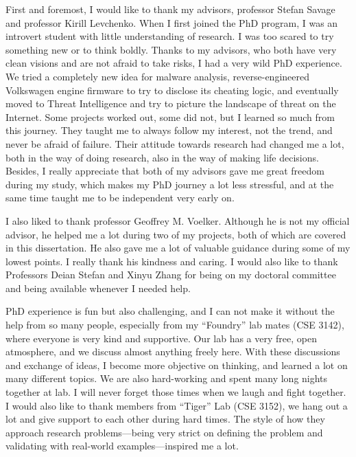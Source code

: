 \begin{acknowledgements}
First and foremost, I would like to thank my advisors, professor Stefan
Savage and professor Kirill Levchenko. When I first joined the PhD program,
I was an introvert student with little understanding of research. I was
too scared to try something new or to think boldly. Thanks to my advisors,
who both have very clean visions and are not afraid to take risks, I had a 
very wild PhD experience. We tried a completely new idea for malware 
analysis, reverse-engineered Volkswagen engine firmware to try to disclose 
its cheating logic, and eventually moved to Threat Intelligence and try to 
picture the landscape of threat on the Internet. Some projects worked out, 
some did not, but I learned so much from this journey. They taught me
to always follow my interest, not the trend, and never be afraid of 
failure. Their attitude towards research had changed me a lot, both in the
way of doing research, also in the way of making life decisions. Besides, 
I really appreciate that both of my advisors gave me great freedom during
my study, which makes my PhD journey a lot less stressful, and at the same 
time taught me to be independent very early on.

I also liked to thank professor Geoffrey M. Voelker. Although he is not my
official advisor, he helped me a lot during two of my projects, both of 
which are covered in this dissertation. He also gave me a lot of valuable 
guidance during some of my lowest points. I really thank his kindness
and caring. I would also like to thank Professors Deian Stefan and Xinyu Zhang 
for being on my doctoral committee and being available whenever I needed help.

PhD experience is fun but also challenging, and I can not make it 
without the help from so many people, especially from my ``Foundry'' lab
mates (CSE 3142), where everyone is very kind and supportive.
Our lab has a very free, open atmosphere, and we discuss almost anything
freely here. With these discussions and exchange of ideas, I become 
more objective on thinking, and learned a lot on many different 
topics. We are also hard-working and spent many long nights together
at lab. I will never forget those times when we laugh and fight together. 
I would also like to thank members from ``Tiger'' Lab (CSE 3152), we 
hang out a lot and give support to each other during hard times. The style 
of how they approach research problems---being very strict on defining the
problem and validating with real-world examples---inspired me a lot.


\end{acknowledgements}
